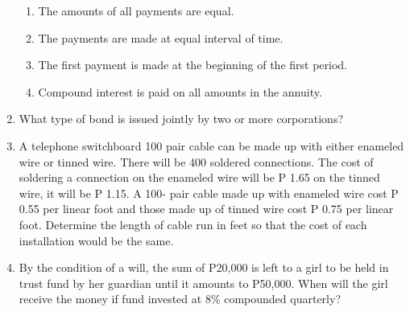 \documentclass[11pt,a4paper]{article}
\begin{document}
\begin{enumerate}
\begin{enumerate}[label=\Alph*.]
\item{The amounts of all payments are equal.}
\item{The payments are made at equal interval of time.}
\item{The first payment is made at the beginning of the first period.}
\item{Compound interest is paid on all amounts in the annuity.}
\end{enumerate}
\item{What type of bond is issued jointly by two or more corporations?}
\\
\item{A telephone switchboard 100 pair cable can be made up with either enameled wire or tinned wire. There will be 400 soldered connections. The cost of soldering a connection on the enameled wire will be P 1.65 on the tinned wire, it will be P 1.15. A 100- pair cable made up with enameled wire cost P 0.55 per linear foot and those made up of tinned wire cost P 0.75 per linear foot. Determine the length of cable run in feet so that the cost of each installation would be the same.}
\\
\item{By the condition of a will, the sum of P20,000 is left to a girl to be held in trust fund by her guardian until it amounts to P50,000. When will the girl receive the money if fund invested at 8\% compounded quarterly?}
\\

\end{enumerate}
\end{document}
